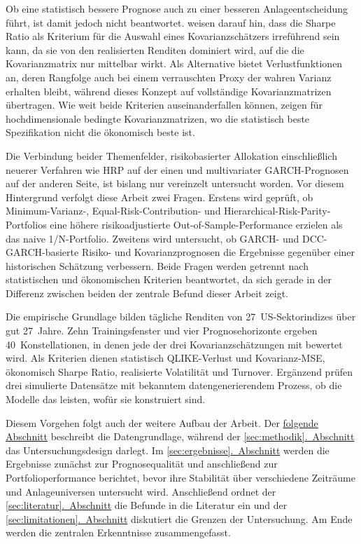 \documentclass[12pt,a4paper]{article}
\begin{document}
Ob eine statistisch bessere Prognose auch zu einer besseren Anlageentscheidung führt, ist damit jedoch nicht beantwortet.
\textcite{engle2006} weisen darauf hin, dass die Sharpe Ratio als Kriterium für die Auswahl eines Kovarianzschätzers irreführend sein kann, da sie von den realisierten Renditen dominiert wird, auf die die Kovarianzmatrix nur mittelbar wirkt.
Als Alternative bietet \textcite{patton2011} Verlustfunktionen an, deren Rangfolge auch bei einem verrauschten Proxy der wahren Varianz erhalten bleibt, während \textcite{laurent2013} dieses Konzept auf vollständige Kovarianzmatrizen übertragen.
Wie weit beide Kriterien auseinanderfallen können, zeigen \textcite{moura2020} für hochdimensionale bedingte Kovarianzmatrizen, wo die statistisch beste Spezifikation nicht die ökonomisch beste ist.

Die Verbindung beider Themenfelder, risikobasierter Allokation einschließlich neuerer Verfahren wie HRP auf der einen und multivariater GARCH-Prognosen auf der anderen Seite, ist bislang nur vereinzelt untersucht worden.
Vor diesem Hintergrund verfolgt diese Arbeit zwei Fragen.
Erstens wird geprüft, ob Minimum-Varianz-, Equal-Risk-Contribution- und Hierarchical-Risk-Parity-Portfolios eine höhere risikoadjustierte Out-of-Sample-Performance erzielen als das naive 1/N-Portfolio.
Zweitens wird untersucht, ob GARCH- und DCC-GARCH-basierte Risiko- und Kovarianzprognosen die Ergebnisse gegenüber einer historischen Schätzung verbessern.
Beide Fragen werden getrennt nach statistischen und ökonomischen Kriterien beantwortet, da sich gerade in der Differenz zwischen beiden der zentrale Befund dieser Arbeit zeigt.

Die empirische Grundlage bilden tägliche Renditen von 27~US-Sektorindizes über gut 27~Jahre.
Zehn Trainingsfenster und vier Prognosehorizonte ergeben 40~Konstellationen, in denen jede der drei Kovarianzschätzungen mit  bewertet wird.
Als Kriterien dienen statistisch QLIKE-Verlust und Kovarianz-MSE, ökonomisch Sharpe Ratio, realisierte Volatilität und Turnover.
Ergänzend prüfen drei simulierte Datensätze mit bekanntem datengenerierendem Prozess, ob die Modelle das leisten, wofür sie konstruiert sind.

Diesem Vorgehen folgt auch der weitere Aufbau der Arbeit.
Der \hyperref[sec:daten]{folgende Abschnitt} beschreibt die Datengrundlage, während der \hyperref[sec:methodik]{\ref*{sec:methodik}.~Abschnitt} das Untersuchungsdesign darlegt.
Im \hyperref[sec:ergebnisse]{\ref*{sec:ergebnisse}.~Abschnitt} werden die Ergebnisse zunächst zur Prognosequalität und anschließend zur Portfolioperformance berichtet, bevor ihre Stabilität über verschiedene Zeiträume und Anlageuniversen untersucht wird.
Anschließend ordnet der \hyperref[sec:literatur]{\ref*{sec:literatur}.~Abschnitt} die Befunde in die Literatur ein und der \hyperref[sec:limitationen]{\ref*{sec:limitationen}.~Abschnitt} diskutiert die Grenzen der Untersuchung.
Am Ende werden die zentralen Erkenntnisse zusammengefasst.
\end{document}
